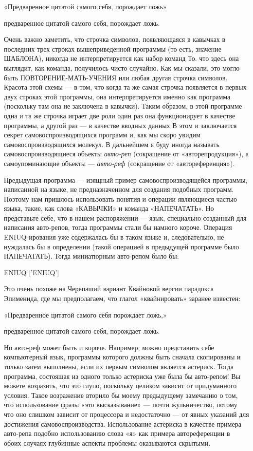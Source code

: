 «Предваренное цитатой самого себя, порождает ложь»

предваренное цитатой самого себя, порождает ложь.

Очень важно заметить, что строчка символов, появляющаяся в кавычках в последних трех строках вышеприведенной программы (то есть, значение ШАБЛОНА), никогда не интерпретируется как набор команд То. что здесь она выглядит, как команда, получилось чисто случайно. Как мы сказали, это могло быть ПОВТОРЕНИЕ-МАТЬ-УЧЕНИЯ или любая другая строчка символов. Красота этой схемы --- в том, что когда та же самая строчка появляется в первых двух строках этой программы, она интерпретируется именно как программа (поскольку там она не заключена в кавычки). Таким образом, в этой программе одна и та же строчка играет две роли один раз она функционирует в качестве программы, а другой раз --- в качестве вводных данных В этом и заключается секрет самовоспроизводящихся программ и, как мы скоро увидим самовоспроизводящихся молекул. В дальнейшем я буду иногда называть самовоспроизводящиеся объекты \emph{авто-реп} (сокращение от «авторепродукция»), а самоупоминающие объекты --- \emph{авто-реф} (сокращение от «автореференция»).

Предыдущая программа --- изящный пример самовоспроизводящейся программы, написанной на языке, не предназначенном для создания подобных программ. Поэтому нам пришлось использовать понятия и операции являющиеся частью языка, такие, как слова «КАВЫЧКИ» и команда «НАПЕЧАТАТЬ». Но представьте себе, что в нашем распоряжении --- язык, специально созданный для написания авто-репов, тогда программы стали бы намного короче. Операция ENIUQ-ирования уже содержалась бы в таком языке и, следовательно, не нуждалась бы в определении (такой операцией в предыдущей программе было НАПЕЧАТАТЬ). Тогда миниатюрным авто-репом было бы:

ENIUQ {[}'ENIUQ'{]}

Это очень похоже на Черепаший вариант Квайновой версии парадокса Эпименида, где мы предполагаем, что глагол «квайнировать» заранее известен:

«Предваренное цитатой самого себя порождает ложь,»

предваренное цитатой самого себя, порождает ложь.

Но авто-реф может быть и короче. Например, можно представить себе компьютерный язык, программы которого должны быть сначала скопированы и только затем выполнены, если их первым символом является астериск. Тогда программа, состоящая из одного только астериска уже была бы авто-репом! Вы можете возразить, что это глупо, поскольку целиком зависит от придуманного условия. Такое возражение вторило бы моему предыдущему замечанию о том, что использование фразы «это высказывание» --- почти жульничество, потому что оно слишком зависит от процессора и недостаточно --- от явных указаний для достижения самовоспроизводства. Использование астериска в качестве примера авто-репа подобно использованию слова «я» как примера автореференции в обоих случаях глубинные аспекты проблемы оказываются скрытыми.

